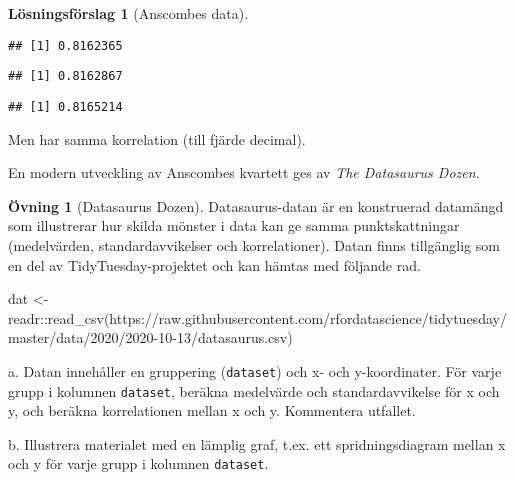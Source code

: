 \documentclass[
]{book}
\newenvironment{Shaded}{\begin{snugshade}}{\end{snugshade}}
\newcommand{\FunctionTok}[1]{\textcolor[rgb]{0.00,0.00,0.00}{#1}}
\newcommand{\NormalTok}[1]{#1}
\newcommand{\OtherTok}[1]{\textcolor[rgb]{0.56,0.35,0.01}{#1}}
\newcommand{\SpecialCharTok}[1]{\textcolor[rgb]{0.00,0.00,0.00}{#1}}
\newcommand{\StringTok}[1]{\textcolor[rgb]{0.31,0.60,0.02}{#1}}
\theoremstyle{definition}
\theoremstyle{definition}
\theoremstyle{definition}
\newtheorem{exercise}{Övning}[chapter]
\theoremstyle{definition}
\newtheorem{hypothesis}{Lösningsförslag}[chapter]
\theoremstyle{remark}
\begin{document}
\begin{hypothesis}[Anscombes data]
\begin{verbatim}
## [1] 0.8162365
\end{verbatim}

\begin{Shaded}
\end{Shaded}

\begin{verbatim}
## [1] 0.8162867
\end{verbatim}

\begin{Shaded}
\end{Shaded}

\begin{verbatim}
## [1] 0.8165214
\end{verbatim}

Men har samma korrelation (till fjärde decimal).

En modern utveckling av Anscombes kvartett ges av \emph{The Datasaurus Dozen}.
\end{hypothesis}

\begin{exercise}[Datasaurus Dozen]
Datasaurus-datan är en konstruerad datamängd som illustrerar hur skilda mönster i data kan ge samma punktskattningar (medelvärden, standardavvikelser och korrelationer). Datan finns tillgänglig som en del av TidyTuesday-projektet och kan hämtas med följande rad.

\begin{Shaded}
\begin{Highlighting}[]
\NormalTok{dat }\OtherTok{\textless{}{-}}\NormalTok{ readr}\SpecialCharTok{::}\FunctionTok{read\_csv}\NormalTok{(}\StringTok{\textquotesingle{}https://raw.githubusercontent.com/rfordatascience/tidytuesday/master/data/2020/2020{-}10{-}13/datasaurus.csv\textquotesingle{}}\NormalTok{)}
\end{Highlighting}
\end{Shaded}

a. Datan innehåller en gruppering (\texttt{dataset}) och x- och y-koordinater. För varje grupp i kolumnen \texttt{dataset}, beräkna medelvärde och standardavvikelse för x och y, och beräkna korrelationen mellan x och y. Kommentera utfallet.

b. Illustrera materialet med en lämplig graf, t.ex. ett spridningsdiagram mellan x och y för varje grupp i kolumnen \texttt{dataset}.
\end{exercise}
\end{document}
